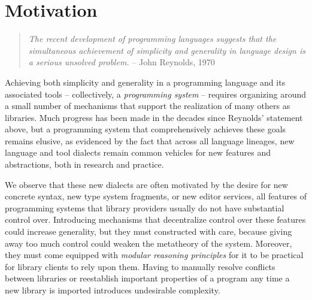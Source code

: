 \vspace{-25pt}
\section{Motivation}\label{motivation}
\begin{quote}\textit{The recent development of programming languages suggests that the simultaneous achievement of simplicity 
and generality in language design is a serious unsolved 
problem.}
-- John Reynolds, 1970 \cite{Reynolds70}\end{quote}
Achieving both simplicity and generality in a programming language and its associated tools -- collectively, a \emph{programming system} -- requires organizing around a small number of mechanisms that support the realization of many others   as libraries. %
Much progress has been made in the decades since Reynolds' statement above, but a programming system that comprehensively achieves these goals remains elusive, as evidenced by the fact that across all language lineages,  new language and tool {dialects} remain common vehicles for new features and abstractions, both in research and practice. 

We observe that these new dialects are often motivated by the desire for new concrete syntax, new type system fragments, or new editor services, all {features} of programming systems that library providers usually do not have substantial control over. %
Introducing mechanisms that decentralize control over these features could increase generality, but they must constructed with care, because giving away too much control could weaken the metatheory of the system. Moreover, they must come equipped with \emph{modular reasoning principles} for it to be practical for library clients to rely upon them. Having to manually resolve conflicts between libraries or reestablish important properties of a program any time a new library is imported introduces undesirable complexity. %

